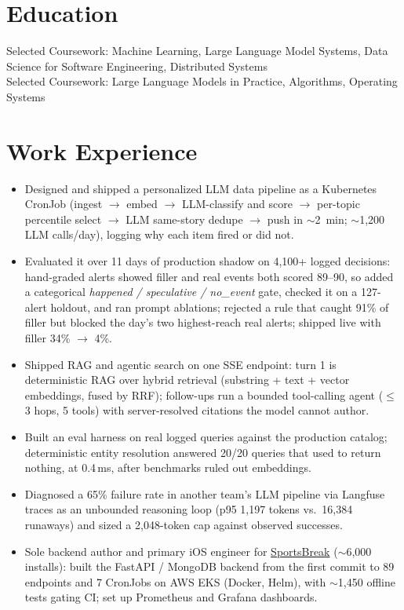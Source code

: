 \documentclass[11pt, letterpaper]{article}
\begin{document}

\section{Education}
Selected Coursework: Machine Learning, Large Language Model Systems, Data Science for Software Engineering, Distributed Systems\\[1pt]
Selected Coursework: Large Language Models in Practice, Algorithms, Operating Systems

\section{Work Experience}
\begin{itemize}
  \item Designed and shipped a personalized LLM data pipeline as a Kubernetes CronJob (ingest $\to$ embed $\to$ LLM-classify and score $\to$ per-topic percentile select $\to$ LLM same-story dedupe $\to$ push in $\sim$2~min; $\sim$1{,}200 LLM calls/day), logging why each item fired or did not.
  \item Evaluated it over 11 days of production shadow on 4{,}100+ logged decisions: hand-graded alerts showed filler and real events both scored 89--90, so added a categorical \textit{happened / speculative / no\_event} gate, checked it on a 127-alert holdout, and ran prompt ablations; rejected a rule that caught 91\% of filler but blocked the day's two highest-reach real alerts; shipped live with filler 34\% $\to$ 4\%.
  \item Shipped RAG and agentic search on one SSE endpoint: turn 1 is deterministic RAG over hybrid retrieval (substring + text + vector embeddings, fused by RRF); follow-ups run a bounded tool-calling agent ($\le$3 hops, 5 tools) with server-resolved citations the model cannot author.
  \item Built an eval harness on real logged queries against the production catalog; deterministic entity resolution answered 20/20 queries that used to return nothing, at 0.4\,ms, after benchmarks ruled out embeddings.
  \item Diagnosed a 65\% failure rate in another team's LLM pipeline via Langfuse traces as an unbounded reasoning loop (p95 1{,}197 tokens vs.\ 16{,}384 runaways) and sized a 2{,}048-token cap against observed successes.
  \item Sole backend author and primary iOS engineer for \href{https://apps.apple.com/app/id6762649287}{SportsBreak} ($\sim$6{,}000 installs): built the FastAPI / MongoDB backend from the first commit to 89 endpoints and 7 CronJobs on AWS EKS (Docker, Helm), with $\sim$1{,}450 offline tests gating CI; set up Prometheus and Grafana dashboards.
\end{itemize}
\end{document}
